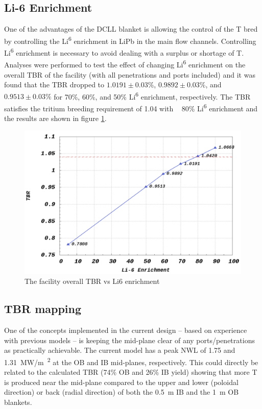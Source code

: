 \documentclass[12pt, letterpaper]{elsarticle}
\begin{document}
\subsection{Li-6 Enrichment} \label{Li-6 Enrichment}
One of the advantages of the DCLL blanket is allowing the control of the T bred by controlling the  Li\textsuperscript{6} enrichment in LiPb in the main flow channels. Controlling Li\textsuperscript{6} enrichment is necessary to avoid dealing with a surplus or shortage of T. Analyses were performed to test the effect of changing Li\textsuperscript{6} enrichment on the overall TBR of the facility (with all penetrations and ports included) and it was found that the TBR dropped to $1.0191\pm 0.03\%$, $0.9892\pm 0.03\%$, and $0.9513\pm 0.03\%$ for 70\%, 60\%, and 50\% Li\textsuperscript{6} enrichment, respectively. The TBR satisfies the tritium breeding requirement of 1.04 with ~ 80\% Li\textsuperscript{6} enrichment and the results are shown in figure \ref{fig:Li6_enrichment}.
\begin{figure}[h!]
  \centering
  \includegraphics[scale=0.2]{../plots/Li6_enrichment.png}
  \caption{The facility overall TBR vs Li6 enrichment}
  \label{fig:Li6_enrichment}
\end{figure}

\subsection{TBR mapping} \label{TBR mapping}
One of the concepts implemented in the current design – based on experience with previous models – is keeping the mid-plane clear of any ports/penetrations as practically achievable. The current model has a peak NWL of 1.75 and \SI{1.31}{MW/m\textsuperscript{2}} at the OB and IB mid-planes, respectively. This could directly be related to the calculated TBR (74\% OB and 26\% IB yield) showing that more T is produced near the mid-plane compared to the upper and lower (poloidal direction) or back (radial direction) of both the \SI{0.5}{m} IB and the \SI{1}{m} OB blankets.\vspace{5mm}
\end{document}
